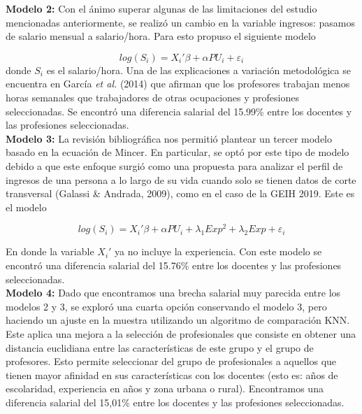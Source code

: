 \documentclass[a4paper]{article}
\begin{document}
\textbf{Modelo 2:} Con el ánimo superar algunas de las limitaciones del estudio mencionadas anteriormente, se realizó un cambio en la variable ingresos: pasamos de salario mensual a salario/hora. Para esto propuso el siguiente modelo

\begin{equation}
log(S_{i})=X_{i}'\beta + \alpha PU_{i}+\varepsilon_{i}
\end{equation}
donde $S_i$ es el salario/hora. Una de las explicaciones a variación metodológica se encuentra en García \textit{et al.} (2014) que afirman que los profesores trabajan menos horas semanales que trabajadores de otras ocupaciones y profesiones seleccionadas. Se encontró una diferencia salarial del 15.99\% entre los docentes y las profesiones seleccionadas.\\

\textbf{Modelo 3:} La revisión bibliográfica nos permitió plantear un tercer modelo basado en la ecuación de Mincer. En particular, se optó por este tipo de modelo debido a que este enfoque surgió como una propuesta para analizar el perfil de ingresos de una persona a lo largo de su vida cuando solo se tienen datos de corte transversal (Galassi \& Andrada, 2009), como en el caso de la GEIH 2019. Este es el modelo

\begin{equation}
log(S_{i})=X_{i}'\beta + \alpha PU_{i}+\lambda_{1}Exp^{2}+\lambda_{2}Exp+\varepsilon_{i}
\end{equation}

En donde la variable $X_{i}'$ ya no incluye la experiencia. Con este modelo se encontró una diferencia salarial del 15.76\% entre los docentes y las profesiones seleccionadas.\\

\textbf{Modelo 4:} Dado que encontramos una brecha salarial muy parecida entre los modelos 2 y 3, se exploró una cuarta opción conservando el modelo 3, pero haciendo un ajuste en la muestra utilizando un algoritmo de comparación KNN. Este aplica una mejora a la selección de profesionales que consiste en obtener una distancia euclidiana entre las características de este grupo y el grupo de profesores. Esto permite seleccionar del grupo de profesionales a aquellos que tienen mayor afinidad en sus características con los docentes (esto es: años de escolaridad, experiencia en años y zona urbana o rural). Encontramos una diferencia salarial del 15,01\% entre los docentes y las profesiones seleccionadas.\\
\end{document}
